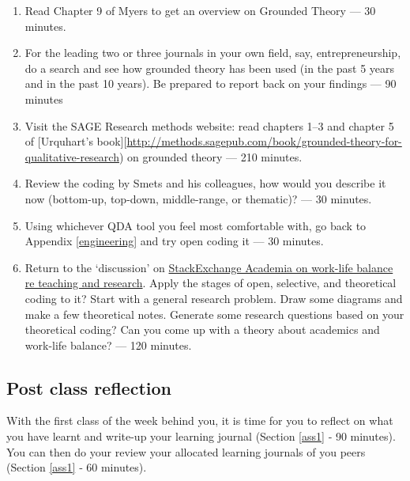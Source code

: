 \documentclass[]{book}
\theoremstyle{definition}
\theoremstyle{definition}
\theoremstyle{definition}
\theoremstyle{remark}
\begin{document}
\begin{enumerate}
\def\labelenumi{\arabic{enumi}.}
\item
  Read Chapter 9 of Myers \autocite*[
  p.~209--220]{myers_2013_qualitativeresearchbusiness} to get an
  overview on Grounded Theory --- 30 minutes.
\item
  For the leading two or three journals in your own field, say,
  entrepreneurship, do a search and see how grounded theory has been
  used (in the past 5 years and in the past 10 years). Be prepared to
  report back on your findings --- 90 minutes
\item
  Visit the SAGE Research methods website: read chapters 1--3 and
  chapter 5 of {[}Urquhart's
  book{]}{[}\url{http://methods.sagepub.com/book/grounded-theory-for-qualitative-research})
  \autocite{urquhart_2017_groundedtheoryqualitative} on grounded theory
  --- 210 minutes.
\item
  Review the coding by Smets and his colleagues, how would you describe
  it now (bottom-up, top-down, middle-range, or thematic)? --- 30
  minutes.
\item
  Using whichever QDA tool you feel most comfortable with, go back to
  Appendix \ref{engineering} and try open coding it --- 30 minutes.
\item
  Return to the `discussion' on
  \href{https://academia.stackexchange.com/questions/89362/how-do-academics-with-teaching-responsibilities-etc-find-the-time-to-do-resear}{StackExchange
  Academia on work-life balance re teaching and research}. Apply the
  stages of open, selective, and theoretical coding to it? Start with a
  general research problem. Draw some diagrams and make a few
  theoretical notes. Generate some research questions based on your
  theoretical coding? Can you come up with a theory about academics and
  work-life balance? --- 120 minutes.
\end{enumerate}

\hypertarget{post-class-reflection-8}{%
\subsection{Post class reflection}\label{post-class-reflection-8}}

With the first class of the week behind you, it is time for you to
reflect on what you have learnt and write-up your learning journal
(Section \ref{ass1} ‐ 90 minutes). You can then do your review your
allocated learning journals of you peers (Section \ref{ass1} ‐ 60
minutes).
\end{document}
